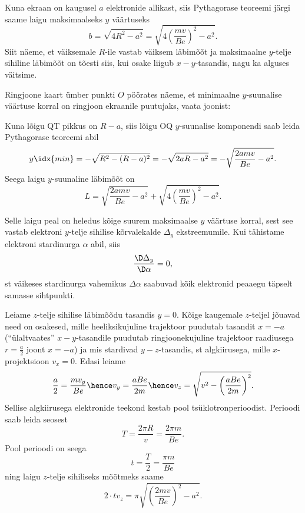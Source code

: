 {Kuna ekraan on kaugusel $a$ elektronide allikast, siis Pythagorase teoreemi järgi saame laigu maksimaalseks $y$ väärtuseks $$b=\sqrt{4R^2-a^2} = \sqrt{4\left(\frac{mv}{Be}\right)^2-a^2}.$$
Siit näeme, et väiksemale $R$-ile vastab väiksem läbimõõt ja maksimaalne $y$-telje sihiline läbimõõt on tõesti siis, kui osake liigub $x-y$-tasandis, nagu ka alguses väitsime.

Ringjoone kaart ümber punkti $O$ pöörates näeme, et minimaalne $y$-suunalise väärtuse korral on ringjoon ekraanile puutujaks, vaata joonist:
\begin{center}
\end{center}
Kuna lõigu QT pikkus on $R-a$, siis lõigu OQ $y$-suunalise komponendi saab leida Pythagorase teoreemi abil
$$y\idx{min}=-\sqrt{R^2-(R-a)^2} = -\sqrt{2aR-a^2}=-\sqrt{\frac{2amv}{Be}-a^2}.$$
Seega laigu $y$-suunaline läbimõõt on
$$L=\sqrt{\frac{2amv}{Be}-a^2} + \sqrt{4\left(\frac{mv}{Be}\right)^2-a^2}.$$

Selle laigu peal on heledus kõige suurem maksimaalse $y$ väärtuse korral, sest see vastab elektroni $y$-telje sihilise kõrvalekalde $\Delta_y$ ekstreemumile. 
Kui tähistame elektroni stardinurga $\alpha$ abil, siis 
$$\frac{\D \Delta_y}{\D \alpha}=0,$$
st väikeses stardinurga vahemikus $\Delta\alpha$ saabuvad kõik elektronid peaaegu täpselt samasse sihtpunkti.

Leiame $z$-telje sihilise läbimõõdu tasandis $y=0$. Kõige kaugemale $z$-teljel jõuavad need on osakesed, mille 
heeliksikujuline trajektoor puudutab tasandit $x=-a$ (``ülaltvaates'' $x-y$-tasandile puudutab ringjoonekujuline trajektoor raadiusega $r=\frac a2$ 
joont $x=-a$) ja mis stardivad $y-z$-tasandis, st algkiirusega, mille $x$-projektsioon $v_x=0$.
Edasi leiame $$\frac a2=\frac {mv_y}{Be}\hence v_y=\frac{aBe}{2m}\hence v_z=\sqrt{v^2-\left(\frac{aBe}{2m}\right)^2}.$$
Sellise algkiirusega elektronide teekond kestab pool tsüklotronperioodist. Perioodi saab leida seosest
\[
T=\frac{2\pi R}{v} = \frac{2\pi m}{Be}.
\]
Pool perioodi on seega
\[
t=\frac{T}{2}=\frac{\pi m}{Be}
\]
ning laigu $z$-telje sihiliseks 
mõõtmeks saame
$$2\cdot tv_z=\pi\sqrt{\left(\frac{2mv}{Be}\right)^2-a^2}.$$
\fi


}
